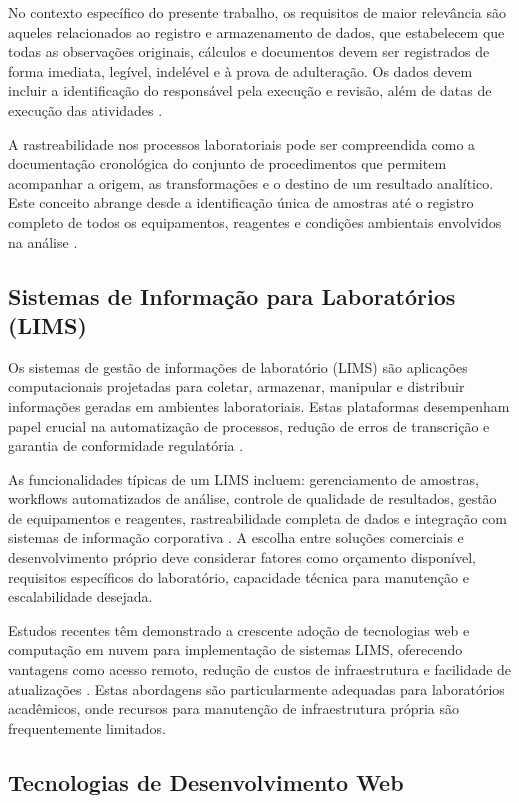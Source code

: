 \documentclass[12pt,a4paper]{article}
\begin{document}
No contexto específico do presente trabalho, os requisitos de maior relevância são aqueles relacionados ao registro e armazenamento de dados, que estabelecem que todas as observações originais, cálculos e documentos devem ser registrados de forma imediata, legível, indelével e à prova de adulteração. Os dados devem incluir a identificação do responsável pela execução e revisão, além de datas de execução das atividades \cite{iso2017}.

A rastreabilidade nos processos laboratoriais pode ser compreendida como a documentação cronológica do conjunto de procedimentos que permitem acompanhar a origem, as transformações e o destino de um resultado analítico. Este conceito abrange desde a identificação única de amostras até o registro completo de todos os equipamentos, reagentes e condições ambientais envolvidos na análise \cite{inmetro2018}.

\subsection{Sistemas de Informação para Laboratórios (LIMS)}

Os sistemas de gestão de informações de laboratório (LIMS) são aplicações computacionais projetadas para coletar, armazenar, manipular e distribuir informações geradas em ambientes laboratoriais. Estas plataformas desempenham papel crucial na automatização de processos, redução de erros de transcrição e garantia de conformidade regulatória \cite{allison2015}.

As funcionalidades típicas de um LIMS incluem: gerenciamento de amostras, workflows automatizados de análise, controle de qualidade de resultados, gestão de equipamentos e reagentes, rastreabilidade completa de dados e integração com sistemas de informação corporativa \cite{wang2018}. A escolha entre soluções comerciais e desenvolvimento próprio deve considerar fatores como orçamento disponível, requisitos específicos do laboratório, capacidade técnica para manutenção e escalabilidade desejada.

Estudos recentes têm demonstrado a crescente adoção de tecnologias web e computação em nuvem para implementação de sistemas LIMS, oferecendo vantagens como acesso remoto, redução de custos de infraestrutura e facilidade de atualizações \cite{morales2019}. Estas abordagens são particularmente adequadas para laboratórios acadêmicos, onde recursos para manutenção de infraestrutura própria são frequentemente limitados.

\subsection{Tecnologias de Desenvolvimento Web}
\end{document}
